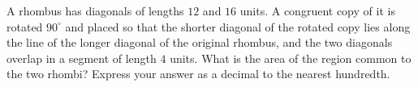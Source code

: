 A rhombus has diagonals of lengths $12$ and $16$ units. A congruent copy of it is rotated $90^\circ$ and placed so that the shorter diagonal of the rotated copy lies along the line of the longer diagonal of the original rhombus, and the two diagonals overlap in a segment of length $4$ units. What is the area of the region common to the two rhombi? Express your answer as a decimal to the nearest hundredth.
